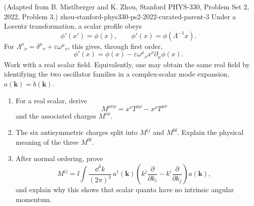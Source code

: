 \begin{enumerate}
  {(Adapted from B. Mistlberger and K. Zhou, Stanford PHYS-330, Problem Set 2, 2022, Problem 3.)}
  {zhou-stanford-phys330-ps2-2022-curated-parent-3}
Under a Lorentz transformation, a scalar profile obeys
\[
 \phi'(x')=\phi(x),\qquad
 \phi'(x)=\phi(\Lambda^{-1}x).
\]
For
\(\Lambda^\mu{}_\nu
=\delta^\mu{}_\nu+\varepsilon\omega^\mu{}_\nu\), this gives, through
first order,
\[
 \phi'(x)=\phi(x)-\varepsilon\omega^\mu{}_\nu
 x^\nu\partial_\mu\phi(x).
\]
Work with a real scalar field.  Equivalently, one may obtain the same
real field by identifying the two oscillator families in a
complex-scalar mode expansion,
\(a(\mathbf k)=b(\mathbf k)\).
\begin{enumerate}
\item
For a real scalar, derive
\[
 M^{\mu\nu\rho}=x^\nu T^{\mu\rho}-x^\rho T^{\mu\nu}
\]
and the associated charges \(M^{\nu\rho}\).
\item
The six antisymmetric charges split into \(M^{ij}\) and \(M^{0\ii}\).
Explain the physical meaning of the three \(M^{0\ii}\).
\item
After normal ordering, prove
\[
 M^{ij}=\ii\int\frac{\dd^3k}{(2\pi)^3}\,
 a^\dagger(\mathbf k)
 \left(k^j\frac{\partial}{\partial k_i}
 -k^i\frac{\partial}{\partial k_j}\right)a(\mathbf k),
\]
and explain why this shows that scalar quanta have no intrinsic angular
momentum.
\end{enumerate}


\end{enumerate}
